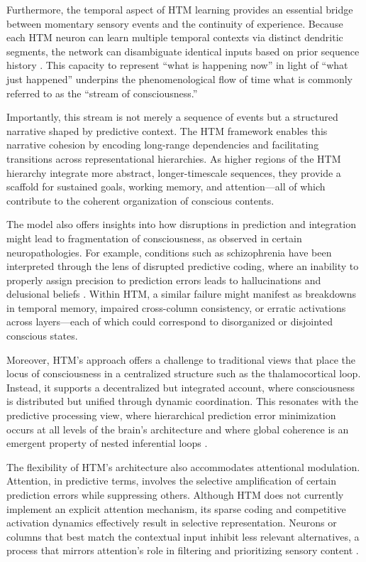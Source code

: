 \documentclass{article}
\begin{document}
Furthermore, the temporal aspect of HTM learning provides an essential bridge between momentary sensory events and the continuity of experience. Because each HTM neuron can learn multiple temporal contexts via distinct dendritic segments, the network can disambiguate identical inputs based on prior sequence history \parencite{hawkins2016why}. This capacity to represent “what is happening now” in light of “what just happened” underpins the phenomenological flow of time what is commonly referred to as the “stream of consciousness.”

Importantly, this stream is not merely a sequence of events but a structured narrative shaped by predictive context. The HTM framework enables this narrative cohesion by encoding long-range dependencies and facilitating transitions across representational hierarchies. As higher regions of the HTM hierarchy integrate more abstract, longer-timescale sequences, they provide a scaffold for sustained goals, working memory, and attention—all of which contribute to the coherent organization of conscious contents.

The model also offers insights into how disruptions in prediction and integration might lead to fragmentation of consciousness, as observed in certain neuropathologies. For example, conditions such as schizophrenia have been interpreted through the lens of disrupted predictive coding, where an inability to properly assign precision to prediction errors leads to hallucinations and delusional beliefs \parencite{clark2016surfing}. Within HTM, a similar failure might manifest as breakdowns in temporal memory, impaired cross-column consistency, or erratic activations across layers—each of which could correspond to disorganized or disjointed conscious states.

Moreover, HTM’s approach offers a challenge to traditional views that place the locus of consciousness in a centralized structure such as the thalamocortical loop. Instead, it supports a decentralized but integrated account, where consciousness is distributed but unified through dynamic coordination. This resonates with the predictive processing view, where hierarchical prediction error minimization occurs at all levels of the brain's architecture and where global coherence is an emergent property of nested inferential loops \parencite{friston2010free}.

The flexibility of HTM’s architecture also accommodates attentional modulation. Attention, in predictive terms, involves the selective amplification of certain prediction errors while suppressing others. Although HTM does not currently implement an explicit attention mechanism, its sparse coding and competitive activation dynamics effectively result in selective representation. Neurons or columns that best match the contextual input inhibit less relevant alternatives, a process that mirrors attention's role in filtering and prioritizing sensory content \parencite{cui2017spatial}.
\end{document}
